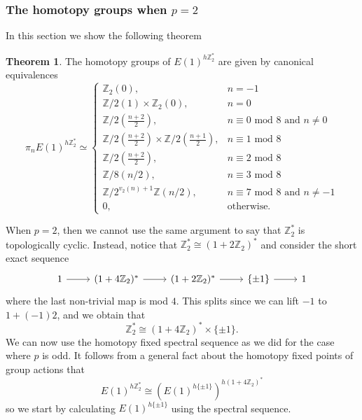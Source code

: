\documentclass[a4paper]{article} %
\theoremstyle{definition}
\newtheorem{theorem}{Theorem} %
\newcommand{\Z}{\mathbb{Z}}
\begin{document}
\subsubsection{The homotopy groups when $p=2$}

In this section we show the following theorem

\begin{theorem}\label{theorem:p=2final}
  The homotopy groups of $E(1)^{h\Z_2^*}$ are given by canonical equivalences
  \[
  \pi_nE(1)^{h\Z_2^*} \simeq
    \begin{cases}
      \Z_2 (0), & n = -1 \\
      \Z/2  (1) \times \Z_2 (0), & n = 0 \\
      \Z / 2(\frac{n+2}{2}), & n \equiv 0 \text{ mod } 8 \text{ and } n \neq 0 \\
      \Z / 2 (\frac{n+2}{2}) \times \Z / 2 ( \frac{n+1}{2}), & n \equiv 1 \text{ mod } 8 \\
      \Z / 2 (\frac{n+2}{2}), & n \equiv 2 \text{ mod } 8 \\
      \Z / 8 (n/2), & n \equiv 3 \text{ mod } 8 \\
      \Z / 2^{v_2(n) + 1}\Z (n/2), & n \equiv 7 \text{ mod } 8 \text{ and } n \neq -1 \\
      0, & \text{otherwise.}
    \end{cases}
  \]
\end{theorem}
When $p=2$, then we cannot use the same argument to say that $\Z_2^*$ is topologically cyclic. Instead, notice that $\Z_2^* \cong (1 + 2\Z_2)^*$ and consider the short exact sequence
\[
\begin{tikzcd}
  1 \arrow{r} & (1 + 4\Z_2)^* \arrow{r} & (1+2\Z_2)^* \arrow{r} & \{\pm 1\} \rar & 1
\end{tikzcd}
\]
where the last non-trivial map is mod $4$. This splits since we can lift $-1$ to $1 + (-1)2$, and we obtain that
\[
\Z_2^* \cong (1 + 4\Z_2)^* \times \{\pm 1\}.
\]
We can now use the homotopy fixed spectral sequence as we did for the case where $p$ is odd. It follows from a general fact about the homotopy fixed points of group actions that
\[
E(1)^{h\Z_2^*} \cong \left(E(1)^{h\{\pm 1\}}\right)^{h(1 + 4\Z_2)^*}
\]
so we start by calculating $E(1)^{h\{\pm 1\}}$ using the spectral sequence.
\end{document}
